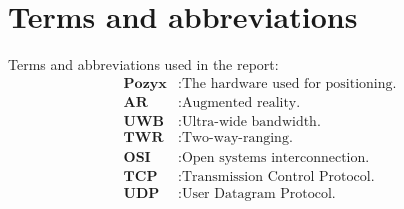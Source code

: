 \chapter*{Terms and abbreviations}
Terms and abbreviations used in the report:
\begin{align*}
    \textbf{Pozyx} &: \text{The hardware used for positioning.} \\
    \textbf{AR} &: \text{Augmented reality.} \\
    \textbf{UWB} &: \text{Ultra-wide bandwidth.} \\
    \textbf{TWR} &: \text{Two-way-ranging.} \\
    \textbf{OSI} &: \text{Open systems interconnection.} \\
    \textbf{TCP} &: \text{Transmission Control Protocol.} \\
    \textbf{UDP} &: \text{User Datagram Protocol.} \\
\end{align*}